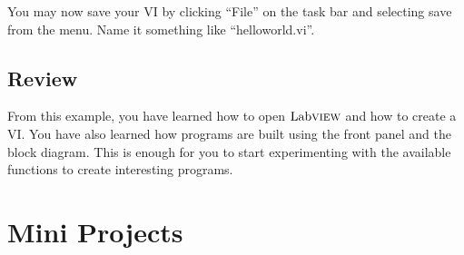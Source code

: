 	You may now save your VI by clicking ``File'' on the task bar and selecting save from the menu. Name it something like ``helloworld.vi''.\\ 
	
	\subsection{Review}
	From this example, you have learned how to open $\text{Lab}\textsc{view}$ and how to create a VI. You have also learned how programs are built using the front panel and the block diagram. This is enough for you to start experimenting with the available functions to create interesting programs.\\
	
	\pagebreak
	\section{Mini Projects}
